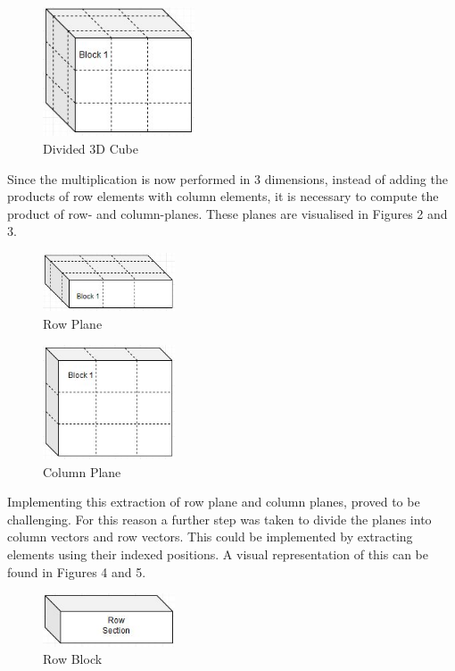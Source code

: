 \documentclass[a4paper, 11pt, onecolumn, conference]{IEEEtran}      %
\begin{document}
\begin{figure}[H]
\centering
\includegraphics[width=0.4\textwidth]{MatrixBlock.JPG}%
\caption{Divided 3D Cube}
\label{fig:1}
\end{figure}

Since the multiplication is now performed in 3 dimensions, instead of adding the products of row elements with column elements, it is necessary to compute the product of row- and column-planes. These planes are visualised in Figures 2 and 3.

\begin{figure}[H]
\centering
\includegraphics[width=0.35\textwidth]{VPlaneBlock.JPG}%
\caption{Row Plane}
\label{fig:2}
\end{figure}

\begin{figure}[H]
\centering
\includegraphics[width=0.35\textwidth]{MatrixPlane.JPG}%
\caption{Column Plane}
\label{fig:3}
\end{figure}

Implementing this extraction of row plane and column planes, proved to be challenging. For this reason a further step was taken to divide the planes into column vectors and row vectors. This could be implemented by extracting elements using their indexed positions. A visual representation of this can be found in Figures 4 and 5.

\begin{figure}[H]
\centering
\includegraphics[width=0.35\textwidth]{RowBlock.JPG}%
\caption{Row Block}
\label{fig:3}
\end{figure}
\end{document}
